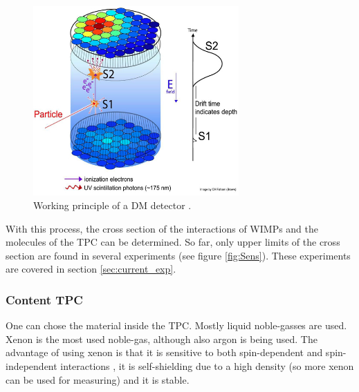 \documentclass{article}
\begin{document}
\begin{figure}[h]
    \centering
    \includegraphics[width=0.7\textwidth]{Principle3.png}
    \caption{Working principle of a DM detector \cite{Akerib:2015gmi}.}
    \label{fig:working}
\end{figure}

With this process, the cross section of the interactions of WIMPs and the molecules of the TPC can be determined. So far, only upper limits of the cross section are found in several experiments (see figure \ref{fig:Sens}). These experiments are covered in section \ref{sec:current_exp}.
\subsubsection{Content TPC}
One can chose the material inside the TPC. Mostly liquid noble-gasses are used. Xenon is the most used noble-gas, although also argon is being used. The advantage of using xenon is that it is sensitive to both spin-dependent and spin-independent interactions \cite{Aprile:2013doa}, it is self-shielding due to a high density (so more xenon can be used for measuring) \cite{Undagoitia:2015gya} and it is stable.


\end{document}
